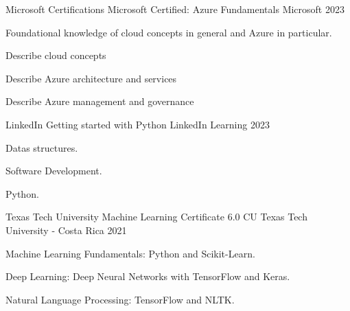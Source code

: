 

\begin{cventries}


  \cventry
  {Microsoft Certifications} %
  {Microsoft Certified: Azure Fundamentals} %
    {Microsoft} %
    {2023} %
    {
      \begin{cvitems} %
        \item Foundational knowledge of cloud concepts in general and Azure in
              particular.
        \item Describe cloud concepts
        \item Describe Azure architecture and services
        \item Describe Azure management and governance
      \end{cvitems}
    }
  \cventry
  {LinkedIn} %
  {Getting started with Python} %
    {LinkedIn Learning} %
    {2023} %
    {
      \begin{cvitems} %
        \item Datas structures.
        \item Software Development.
        \item Python.
      \end{cvitems}
    }
  \cventry
  {Texas Tech University} %
  {Machine Learning Certificate 6.0 CU} %
    {Texas Tech University - Costa Rica} %
    {2021} %
    {
      \begin{cvitems} %
        \item Machine Learning Fundamentals: Python and Scikit-Learn.
        \item Deep Learning: Deep Neural Networks with TensorFlow and Keras.
        \item Natural Language Processing: TensorFlow and NLTK.

\end{cvitems}}
\end{cventries}
